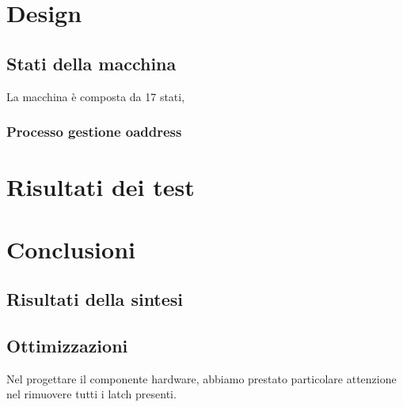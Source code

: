 \documentclass[12pt, table, xcdraw]{article}
\begin{document}
\section{Design}
\subsection{Stati della macchina}
La macchina è composta da 17 stati, 
\subsubsection{Processo gestione oaddress}



\section{Risultati dei test}

\section{Conclusioni}
\subsection{Risultati della sintesi}
\subsection{Ottimizzazioni}
Nel progettare il componente hardware, abbiamo prestato particolare attenzione nel rimuovere tutti i latch presenti.
\end{document}
